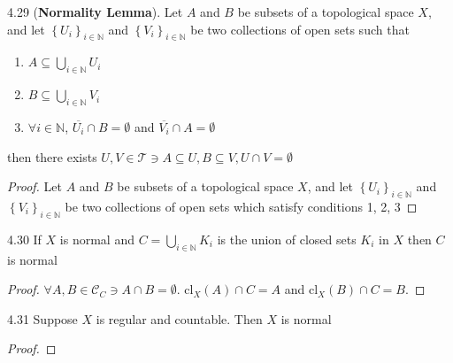 \documentclass{article}
\newcommand*{\T}{\mathcal{T}}
\newcommand*{\cl}{\mathrm{cl}}
\newcommand*{\subeq}{\subseteq}
\newcommand{\N}{\mathbb{N}}
\begin{document}
\begin{claim}{4.29}\label{Claim 4.29.}
    (\textbf{Normality Lemma}). Let $A$ and $B$ be subsets of a topological space $X$, and let $\left\{ U_i \right\}_{i \in \N}$ and $\left\{ V_i \right\}_{i \in \N}$ be two collections of open sets such that 
    
    \begin{enumerate}
        \item $A \subeq \bigcup_{i \in \N}U_i$
        \item $B \subeq \bigcup_{i \in \N} V_i$
        \item $\forall i \in \N$, $\overline{U_i} \cap B = \emptyset$ and $\overline{V_i} \cap A = \emptyset$    
    \end{enumerate}
    then there exists $U, V \in \T \ni A \subeq U, B \subeq V, U \cap V = \emptyset$ 
\end{claim}
\begin{proof}
    Let $A$ and $B$ be subsets of a topological space $X$, and let $\left\{ U_i \right\}_{i \in \N}$ and $\left\{ V_i \right\}_{i \in \N}$ be two collections of open sets which satisfy conditions 1, 2, 3 

\end{proof}

\bigskip

\begin{claim}{4.30}\label{Claim 4.30.}
    If $X$ is normal and $C = \bigcup_{i \in \N} K_i$ is the union of closed sets $K_i$ in $X$ then $C$ is normal     
\end{claim}
\begin{proof}
    $\forall A, B \in \mathcal{C}_C \ni A \cap B = \emptyset$. $\cl_X(A) \cap C = A$ and $\cl_X(B) \cap C = B$.     
\end{proof}

\bigskip

\begin{claim}{4.31}\label{Claim 4.31.}
    Suppose $X$ is regular and countable. Then $X$ is normal  
\end{claim}
\begin{proof}
    
\end{proof}
\end{document}
